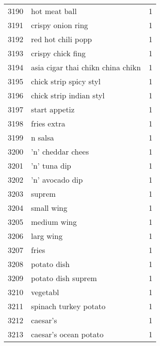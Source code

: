 \begin{tabular}{llr}
3190 &                                      hot meat ball &      1 \\
3191 &                                  crispy onion ring &      1 \\
3192 &                                 red hot chili popp &      1 \\
3193 &                                  crispy chick fing &      1 \\
3194 &                  asia cigar thai chikn china chikn &      1 \\
3195 &                             chick strip spicy styl &      1 \\
3196 &                            chick strip indian styl &      1 \\
3197 &                                      start appetiz &      1 \\
3198 &                                        fries extra &      1 \\
3199 &                                            n salsa &      1 \\
3200 &                                  ’n’ cheddar chees &      1 \\
3201 &                                       ’n’ tuna dip &      1 \\
3202 &                                    ’n’ avocado dip &      1 \\
3203 &                                             suprem &      1 \\
3204 &                                         small wing &      1 \\
3205 &                                        medium wing &      1 \\
3206 &                                          larg wing &      1 \\
3207 &                                              fries &      1 \\
3208 &                                        potato dish &      1 \\
3209 &                                 potato dish suprem &      1 \\
3210 &                                           vegetabl &      1 \\
3211 &                              spinach turkey potato &      1 \\
3212 &                                           caesar’s &      1 \\
3213 &                              caesar’s ocean potato &      1 \\

\end{tabular}
